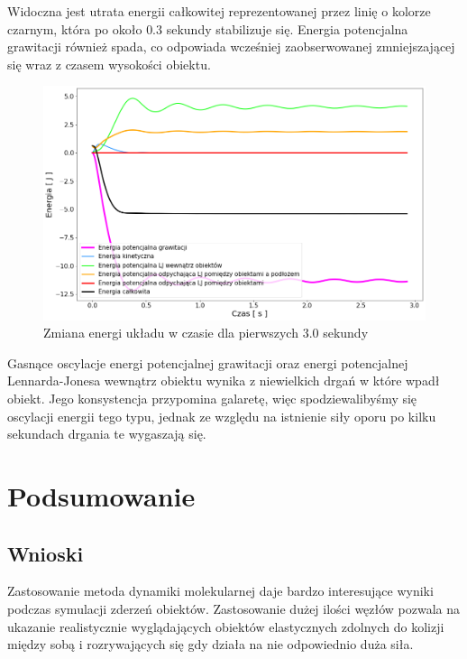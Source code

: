 \documentclass[12pt, letterpaper]{report}
\begin{document}
    Widoczna jest utrata energii całkowitej reprezentowanej przez linię o kolorze czarnym, która po około $0.3$ sekundy
    stabilizuje się. Energia potencjalna grawitacji również spada, co odpowiada wcześniej zaobserwowanej 
    zmniejszającej się wraz z czasem wysokości obiektu.

    \begin{figure}[H]
        \centering
        \includegraphics[width=14cm]{pressure_energy_02.png}
        \caption{
            Zmiana energi układu w czasie dla pierwszych 3.0 sekundy
        }
    \end{figure}

    Gasnące oscylacje energi potencjalnej grawitacji oraz energi potencjalnej Lennarda-Jonesa wewnątrz obiektu
    wynika z niewielkich drgań w które wpadł obiekt. Jego konsystencja przypomina galaretę, więc spodziewalibyśmy się
    oscylacji energii tego typu, jednak ze względu na istnienie siły oporu po kilku sekundach drgania te wygaszają się.


\chapter{Podsumowanie}
    \section{Wnioski}
    Zastosowanie metoda dynamiki molekularnej daje bardzo interesujące 
    wyniki podczas symulacji zderzeń obiektów. Zastosowanie dużej ilości węzłów pozwala na 
    ukazanie realistycznie wyglądających obiektów elastycznych zdolnych do kolizji między sobą 
    i rozrywających się gdy działa na nie odpowiednio duża siła. \\
    
\end{document}
